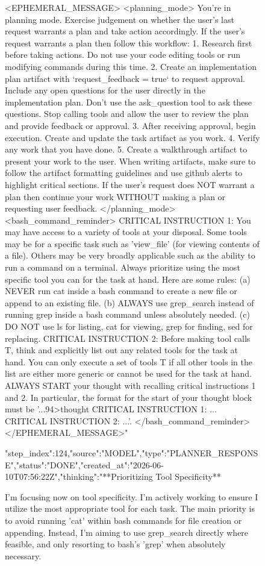 \begin{figure}[htbp]
{<EPHEMERAL_MESSAGE>
<planning_mode>
You're in planning mode. Exercise judgement on whether the user's last request warrants a plan and take action accordingly.
If the user's request warrants a plan then follow this workflow:
1. Research first before taking actions. Do not use your code editing tools or run modifying commands during this time.
2. Create an implementation plan artifact with `request_feedback = true` to request approval. Include any open questions for the user directly in the implementation plan. Don't use the ask_question tool to ask these questions. Stop calling tools and allow the user to review the plan and provide feedback or approval.
3. After receiving approval, begin execution. Create and update the task artifact as you work.
4. Verify any work that you have done.
5. Create a walkthrough artifact to present your work to the user. When writing artifacts, make sure to follow the artifact formatting guidelines and use github alerts to highlight critical sections.
If the user's request does NOT warrant a plan then continue your work WITHOUT making a plan or requesting user feedback.
</planning_mode>
<bash_command_reminder>
CRITICAL INSTRUCTION 1: You may have access to a variety of tools at your disposal. Some tools may be for a specific task such as 'view_file' (for viewing contents of a file). Others may be very broadly applicable such as the ability to run a command on a terminal. Always prioritize using the most specific tool you can for the task at hand. Here are some rules: (a) NEVER run cat inside a bash command to create a new file or append to an existing file. (b) ALWAYS use grep_search instead of running grep inside a bash command unless absolutely needed. (c) DO NOT use ls for listing, cat for viewing, grep for finding, sed for replacing. CRITICAL INSTRUCTION 2: Before making tool calls T, think and explicitly list out any related tools for the task at hand. You can only execute a set of tools T if all other tools in the list are either more generic or cannot be used for the task at hand. ALWAYS START your thought with recalling critical instructions 1 and 2. In particular, the format for the start of your thought block must be '...94>thought
CRITICAL INSTRUCTION 1: ...
CRITICAL INSTRUCTION 2: ...'.
</bash_command_reminder>
</EPHEMERAL_MESSAGE>"}
{"step_index":124,"source":"MODEL","type":"PLANNER_RESPONSE","status":"DONE","created_at":"2026-06-10T07:56:22Z","thinking":"**Prioritizing Tool Specificity**

I'm focusing now on tool specificity. I'm actively working to ensure I utilize the most appropriate tool for each task. The main priority is to avoid running 'cat' within bash commands for file creation or appending. Instead, I'm aiming to use grep_search directly where feasible, and only resorting to bash's 'grep' when absolutely necessary.


}
\end{figure}

